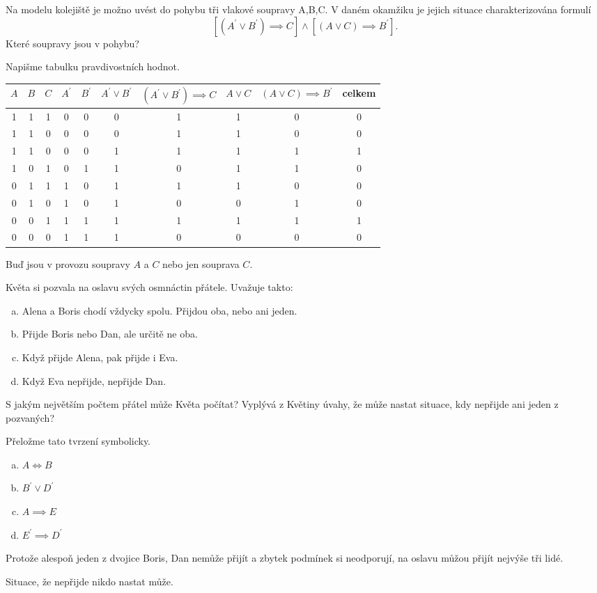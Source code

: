 \begin{example}[SMP 144/8]
  Na modelu kolejiště je možno uvést do pohybu tři vlakové soupravy A,B,C. V daném okamžiku je jejich
situace charakterizována formulí $$\left[(A^\prime \lor B^\prime) \implies C\right]\land\left[(A \lor C) \implies B^\prime\right].$$ Které soupravy jsou v pohybu?

\rm Napišme tabulku pravdivostních hodnot.
\begin{center}
  \begin{tabular}{c c c c c | c c c c c}
    $A$ & $B$ & $C$ & $A^\prime$ & $B^\prime$ & $A^\prime \lor B^\prime$ & $(A^\prime \lor B^\prime) \implies C$ & $A\lor C$ & $(A \lor C) \implies B^\prime $ & celkem\\
    \hline
    1 & 1 & 1 & 0 & 0 & 0 & 1 & 1 & 0 & 0 \\
    1 & 1 & 0 & 0 & 0 & 0 & 1 & 1 & 0 & 0 \\
    1 & 1 & 0 & 0 & 0 & 1 & 1 & 1 & 1 & 1 \\
    1 & 0 & 1 & 0 & 1 & 1 & 0 & 1 & 1 & 0 \\
    0 & 1 & 1 & 1 & 0 & 1 & 1 & 1 & 0 & 0 \\
    0 & 1 & 0 & 1 & 0 & 1 & 0 & 0 & 1 & 0 \\
    0 & 0 & 1 & 1 & 1 & 1 & 1 & 1 & 1 & 1 \\
    0 & 0 & 0 & 1 & 1 & 1 & 0 & 0 & 0 & 0
  \end{tabular}
\end{center}
Buď jsou v provozu soupravy $A$ a $C$ nebo jen souprava $C$.
\end{example}

\begin{example}[SMP 144/10]
  Květa si pozvala na oslavu svých osmnáctin přátele. Uvažuje takto:
  \begin{enumerate}[a.]
    \item Alena a Boris chodí vždycky spolu. Přijdou oba, nebo ani jeden.
    \item Přijde Boris nebo Dan, ale určitě ne oba.
    \item Když přijde Alena, pak přijde i Eva.
    \item Když Eva nepřijde, nepřijde Dan.
  \end{enumerate}
  S jakým největším počtem přátel může Květa počítat? Vyplývá z Květiny úvahy, že může nastat situace, kdy nepřijde ani jeden z pozvaných?

  \rm Přeložme tato tvrzení symbolicky.
  \begin{enumerate}[a.]
    \item $A\iff B$
    \item $B^\prime \lor D^\prime$
    \item $A\implies E$
    \item $E^\prime \implies D^\prime$
  \end{enumerate}
  Protože alespoň jeden z dvojice Boris, Dan nemůže přijít a zbytek podmínek si neodporují, na oslavu můžou přijít nejvýše tři lidé.

  Situace, že nepřijde nikdo nastat může.
\end{example}

